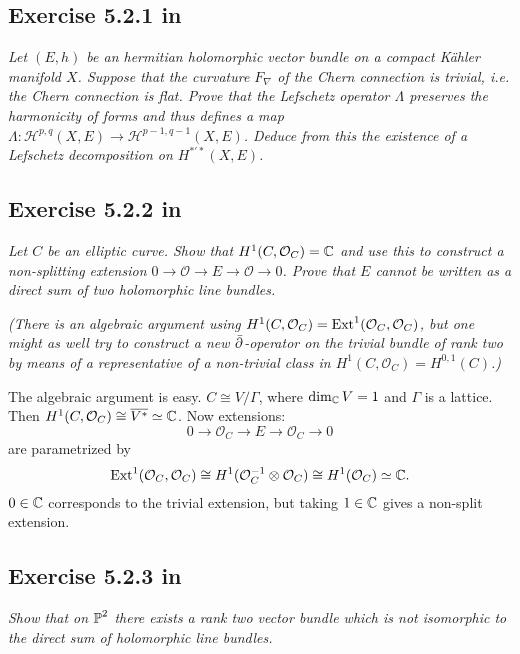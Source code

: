 \documentclass{article}
\begin{document}
\subsection*{Exercise 5.2.1 in \cite{Huy}}
\emph{Let $(E, h)$ be an hermitian holomorphic vector bundle on a compact K\"{a}hler
manifold $X$. Suppose that the curvature $F_{\nabla}$ of the Chern connection is trivial, i.e.
the Chern connection is flat. Prove that the Lefschetz operator $\Lambda$ preserves the
harmonicity of forms and thus defines a map $\Lambda : \mathcal{H}^{p,q}(X,E) \to \mathcal{H}^{p-1,q-1}(X,E)$.
Deduce from this the existence of a Lefschetz decomposition on $H^{*'*}(X,E)$.}
\vspace{3mm}


\subsection*{Exercise 5.2.2 in \cite{Huy}}
\emph{Let $C$ be an elliptic curve. Show that $H^1(C,\mathcal{O}_C) = \mathbb{C}$ and use this to
construct a non-splitting extension $0\to \mathcal{O} \to E \to \mathcal{O} \to 0$. Prove that $E$ cannot be
written as a direct sum of two holomorphic line bundles.}

\emph{(There is an algebraic argument using $H^1(C,\mathcal{O}_C) = \operatorname{Ext}^1(\mathcal{O}_C, \mathcal{O}_C)$, but one
might as well try to construct a new $\bar {\partial}$-operator on the trivial bundle of rank two
by means of a representative of a non-trivial class in $H^1(C, \mathcal{O}_C) = H^{0,1}(C)$.)}
\vspace{3mm}

The algebraic argument is easy. $C \cong V/\Gamma$, where $\dim_{\mathbb{C}} V = 1$ and $\Gamma$ is a lattice. Then 
$H^1(C,\mathcal{O}_C) \cong \overline{V^*} \simeq \mathbb{C}$. Now extensions:
\[ 0\to \mathcal{O}_C \to E \to \mathcal{O}_C \to 0	\]
are parametrized by
\[	\operatorname{Ext}^1(\mathcal{O}_C,\mathcal{O}_C) \cong H^1(\mathcal{O}_C^{-1} \otimes \mathcal{O}_C) \cong H^1(\mathcal{O}_C) \simeq \mathbb{C}.	\]
$0 \in \mathbb{C}$ corresponds to the trivial extension, but taking $1 \in \mathbb{C}$ gives a non-split extension.


\subsection*{Exercise 5.2.3 in \cite{Huy}}
\emph{Show that on $\operatorname{\mathbb{P}}^2$ there exists a rank two vector bundle which is not isomorphic
to the direct sum of holomorphic line bundles.}
\vspace{3mm}
\end{document}
